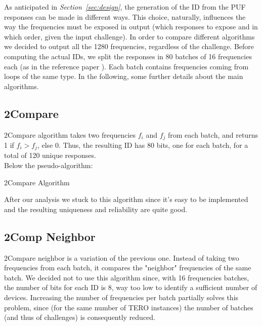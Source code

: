 %
%

As anticipated in \textit{Section~\ref{sec:design}}, the generation of the ID from the PUF responses can be made in different ways. This choice, naturally,
influences the way the frequencies must be exposed in output (which responses to expose and in which order, given the input challenge). In order to
compare different algorithms we decided to output all the 1280 frequencies, regardless of the challenge. Before computing the actual IDs, we
split the responses in 80 batches of 16 frequencies each (as in the reference paper \cite{ref_pap}). Each batch contains frequencies coming from loops of the same type.
In the following, some further details about the main algorithms.

\subsection{2Compare}
\label{subsec:2Comp}

2Compare algorithm takes two frequencies $f_i$ and $f_j$ from each batch, and returns 1 if $f_i > f_j$, else $0$.
Thus, the resulting ID has 80 bits, one for each batch, for a total of 120 unique responses.\\

Below the pseudo-algorithm:

\begin{algorithm}[H]
    \label{alg:2comp}
    \caption{2Compare Algorithm}
    \label{alg:var1}
    \label{protocol11}
    \begin{algorithmic}[1]
    \ENDFOR
    \end{algorithmic}
    \end{algorithm} 

After our analysis we stuck to this algorithm since it's easy to be implemented and the resulting uniqueness and reliability
are quite good.

\subsection{2Comp Neighbor}
\label{subsec:2Compneigh}

2Compare neighbor is a variation of the previous one. Instead of taking two frequencies from each batch, it compares the
"neighbor" frequencies of the same batch. We decided not to use this algorithm since, with 16 frequencies batches, the
number of bits for each ID is 8, way too low to identify a sufficient number of devices. Increasing the number of frequencies
per batch partially solves this problem, since (for the same number of TERO instances) the number of batches (and thus of challenges)
is consequently reduced.



